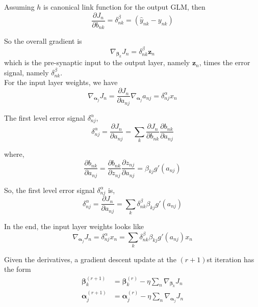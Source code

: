 \documentclass[12pt,a4paper]{article}%
\theoremstyle{definition}
\theoremstyle{plain}
\numberwithin{equation}{section}
\begin{document}
Assuming $h$ is canonical link function for the output GLM, then 
\begin{equation}
\frac{\partial J_{n}}{\partial b_{nk}} = \delta^{\beta}_{nk} = (\hat{y}_{nk}-y_{nk})
\end{equation}

So the overall gradient is 
\begin{equation}
\nabla_{\boldsymbol{\beta}_{k}} J_{n} = \delta^{\beta}_{nk} \mathbf{z}_{n}
\end{equation}
which is the pre-synaptic input to the output layer, namely $\mathbf{z}_{n}$, times the error signal, namely $\delta^{\beta}_{nk}$.~\\

For the input layer weights, we have 
\begin{equation}
\nabla_{\boldsymbol{\alpha}_{j}} J_{n} = \frac{\partial J_{n}}{\partial a_{nj}} \nabla_{\boldsymbol{\alpha}_{j}} a_{nj} = \delta^{\alpha}_{nj} x_{n}
\end{equation}

The first level error signal $\delta^{\alpha}_{nj}$, 
\begin{equation}
\delta^{\alpha}_{nj} =  \frac{\partial J_{n}}{\partial a_{nj}} = \sum\limits_{k} \frac{\partial J_{n}}{\partial b_{nk}} \frac{\partial b_{nk}}{\partial a_{nj}}
\end{equation}

where,
\begin{equation}
\frac{\partial b_{nk}}{\partial a_{nj}} = \frac{\partial b_{nk}}{\partial z_{nj}} \frac{\partial z_{nj}}{\partial a_{nj}} = \beta_{kj} g'(a_{nj})
\end{equation}

So, the first level error signal $\delta^{\alpha}_{nj}$ is,
\begin{equation}
\delta^{\alpha}_{nj} =  \frac{\partial J_{n}}{\partial a_{nj}} = \sum\limits_{k} \delta^{\beta}_{nk} \beta_{kj} g'(a_{nj})
\end{equation}

In the end, the input layer weights looks like
\begin{equation}
\nabla_{\boldsymbol{\alpha}_{j}} J_{n} = \delta^{\alpha}_{nj} x_{n} = \sum\limits_{k} \delta^{\beta}_{nk} \beta_{kj} g'(a_{nj})x_{n}
\end{equation}

Given the derivatives, a gradient descent update at the $(r+1)$st iteration has the form
\begin{align*}
\boldsymbol{\beta}_{k}^{(r+1)} &=  \boldsymbol{\beta}_{k}^{(r)} - \eta \sum\limits_{n} \nabla_{\boldsymbol{\beta}_{k}} J_{n} \\
\boldsymbol{\alpha}_{j}^{(r+1)} &= \boldsymbol{\alpha}_{j}^{(r)} - \eta \sum\limits_{n} \nabla_{\boldsymbol{\alpha}_{j}} J_{n} 
\end{align*}
\end{document}
